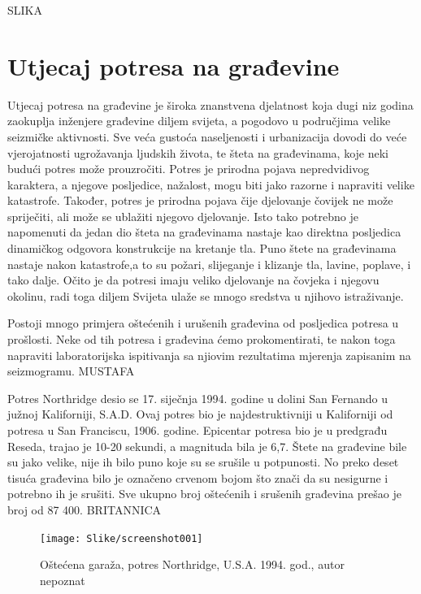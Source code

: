 \documentclass[12pt]{book}
\begin{document}
SLIKA

\section{Utjecaj potresa na građevine}

Utjecaj potresa na građevine je široka znanstvena djelatnost koja dugi niz godina zaokuplja inženjere građevine diljem svijeta, a pogodovo u područjima velike seizmičke aktivnosti. Sve veća gustoća naseljenosti i urbanizacija dovodi do veće vjerojatnosti  ugrožavanja ljudskih života, te šteta na građevinama, koje neki budući potres može prouzročiti. Potres je prirodna pojava nepredvidivog karaktera, a njegove posljedice, nažalost, mogu biti jako razorne i napraviti velike katastrofe. Također, potres je prirodna pojava čije djelovanje čovijek ne može spriječiti, ali može se ublažiti njegovo djelovanje. Isto tako potrebno je napomenuti da jedan dio šteta na građevinama nastaje kao direktna posljedica dinamičkog odgovora konstrukcije na kretanje tla. Puno štete na građevinama nastaje nakon katastrofe,a to su požari, slijeganje i klizanje tla, lavine, poplave, i tako dalje. Očito je da potresi imaju veliko djelovanje na čovjeka i njegovu okolinu, radi toga diljem Svijeta ulaže se mnogo sredstva u njihovo istraživanje.

Postoji mnogo primjera oštećenih i urušenih građevina od posljedica potresa u prošlosti. Neke od tih potresa i građevina ćemo prokomentirati, te nakon toga napraviti laboratorijska ispitivanja sa njiovim rezultatima mjerenja zapisanim na seizmogramu. MUSTAFA

\newpage

Potres Northridge desio se 17. siječnja 1994. godine u dolini San Fernando u južnoj Kaliforniji, S.A.D. Ovaj potres bio je najdestruktivniji u Kaliforniji od potresa u San Franciscu, 1906. godine. Epicentar potresa bio je u predgrađu Reseda, trajao je 10-20 sekundi, a magnituda bila je 6,7. Štete na građevine bile su jako velike, nije ih bilo puno koje su se srušile u potpunosti. No preko deset tisuća građevina bilo je označeno crvenom bojom što znači da su nesigurne i potrebno ih je srušiti. Sve ukupno broj oštećenih i srušenih građevina prešao je broj od 87 400. BRITANNICA

\begin{figure}[h]
	\centering
	\texttt{[image: Slike/screenshot001]}
	\caption{Oštećena garaža, potres Northridge, U.S.A. 1994. god., autor nepoznat}
	\label{fig:screenshot001}
\end{figure}
\end{document}
